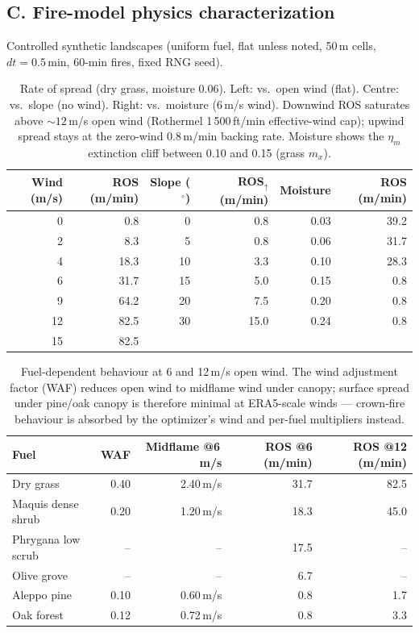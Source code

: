 \documentclass[11pt]{article}
\begin{document}
\subsection*{C. Fire-model physics characterization}

Controlled synthetic landscapes (uniform fuel, flat unless noted, 50\,m
cells, $dt=0.5$\,min, 60-min fires, fixed RNG seed).

\begin{table}[htbp]
\centering
\caption{Rate of spread (dry grass, moisture 0.06). Left: vs.\ open wind
(flat). Centre: vs.\ slope (no wind). Right: vs.\ moisture (6\,m/s wind).
Downwind ROS saturates above ${\sim}12$\,m/s open wind (Rothermel
1\,500\,ft/min effective-wind cap); upwind spread stays at the zero-wind
0.8\,m/min backing rate. Moisture shows the $\eta_m$ extinction cliff
between 0.10 and 0.15 (grass $m_x$).}
\begin{tabular}{rr@{\qquad}rr@{\qquad}rr}
\toprule
Wind (m/s) & ROS (m/min) & Slope ($^\circ$) & ROS$_{\uparrow}$ (m/min) & Moisture & ROS (m/min) \\
\midrule
 0 &  0.8 &  0 &  0.8 & 0.03 & 39.2 \\
 2 &  8.3 &  5 &  0.8 & 0.06 & 31.7 \\
 4 & 18.3 & 10 &  3.3 & 0.10 & 28.3 \\
 6 & 31.7 & 15 &  5.0 & 0.15 &  0.8 \\
 9 & 64.2 & 20 &  7.5 & 0.20 &  0.8 \\
12 & 82.5 & 30 & 15.0 & 0.24 &  0.8 \\
15 & 82.5 &    &      &      &      \\
\bottomrule
\end{tabular}
\end{table}

\begin{table}[htbp]
\centering
\caption{Fuel-dependent behaviour at 6 and 12\,m/s open wind. The wind
adjustment factor (WAF) reduces open wind to midflame wind under canopy;
surface spread under pine/oak canopy is therefore minimal at ERA5-scale
winds --- crown-fire behaviour is absorbed by the optimizer's wind and
per-fuel multipliers instead.}
\begin{tabular}{lrrrr}
\toprule
Fuel & WAF & Midflame @6\,m/s & ROS @6 (m/min) & ROS @12 (m/min) \\
\midrule
Dry grass          & 0.40 & 2.40\,m/s & 31.7 & 82.5 \\
Maquis dense shrub & 0.20 & 1.20\,m/s & 18.3 & 45.0 \\
Phrygana low scrub & --   & --        & 17.5 & --   \\
Olive grove        & --   & --        &  6.7 & --   \\
Aleppo pine        & 0.10 & 0.60\,m/s &  0.8 &  1.7 \\
Oak forest         & 0.12 & 0.72\,m/s &  0.8 &  3.3 \\
\bottomrule
\end{tabular}
\end{table}
\end{document}
